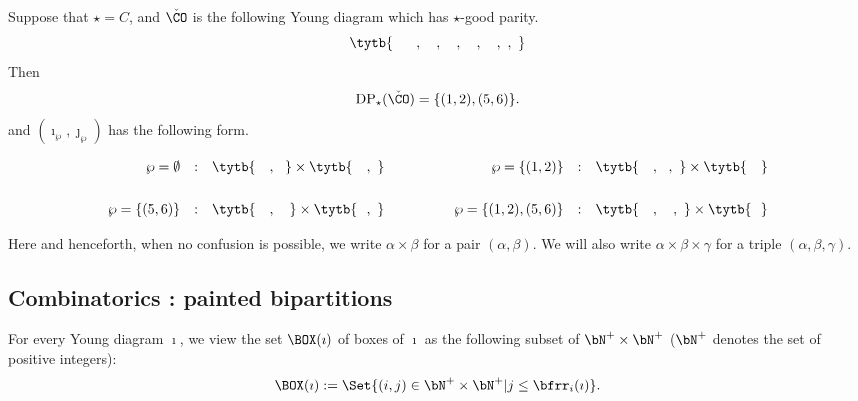 \documentclass[ssunip.tex]{subfiles}
\begin{document}
\begin{Example} Suppose that $\star=C$, and $\check \CO$ is the following Young diagram which has $\star$-good parity.
\begin{equation*}\label{eq:sp-nsp.C}
  \tytb{\ \ \ \ \  , \ \ \  , \ \ \ , \ \ \  , \ \ \ , \  ,\  }
   \end{equation*}
   Then
\[
  \mathrm{DP}_\star(\check \CO)=\{(1,2), (5,6)\}.
\]
and $(\imath_\wp, \jmath_\wp)$ %
has the  following form.

\begin{equation*}\label{eq:sp-nsp.C}
\begin{array}{rclcrcl}
  \wp=\emptyset & : & \tytb{\ \ \ ,\ \  } \times \tytb{\ \ \ , \  }  & \qquad \quad &  \wp=\{(1,2)\}& : & \tytb{\ \ \  , \ \ , \   } \times \tytb{\ \ \  } \medskip \medskip \medskip \\
    \wp=\{(5,6)\} & : & \tytb{\ \ \ ,\ \ \ } \times \tytb{\ \ , \   }  & \qquad \quad &  \wp=\{(1,2), (5,6)\}  & : & \tytb{\ \ \  , \ \ \ ,  \ } \times \tytb{\ \   } \\
  \end{array}
  \end{equation*}

\end{Example}


Here and henceforth, when no confusion is possible, we write $\alpha\times \beta$ for a pair $(\alpha, \beta)$.  We will also write $\alpha\times \beta\times \gamma$ for a triple $(\alpha, \beta, \gamma)$.


\subsection{Combinatorics : painted bipartitions}

For every Young diagram $\imath$, we view the set $\BOX(\imath)$ of boxes of $\imath$ as the following subset 
of $\bN^+\times \bN^+$ ($\bN^+$ denotes the set of positive integers):
\begin{equation}\label{eq:BOX}
\BOX(\imath):=\Set{(i,j)\in\bN^+\times \bN^+| j\leq \bfrr_i(\imath)}.
\end{equation}

\end{document}
